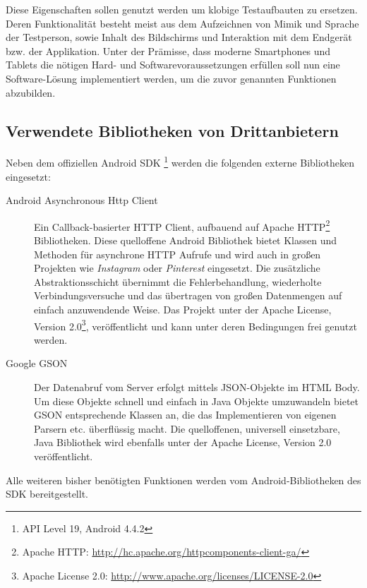 Diese Eigenschaften sollen genutzt werden um klobige Testaufbauten zu ersetzen. 
Deren Funktionalität besteht meist aus dem Aufzeichnen von Mimik und Sprache der Testperson, sowie Inhalt des Bildschirms und Interaktion mit dem Endgerät bzw. der Applikation.
Unter der Prämisse, dass moderne Smartphones und Tablets die nötigen Hard- und Softwarevoraussetzungen erfüllen soll nun eine Software-Lösung implementiert werden, um die zuvor genannten Funktionen abzubilden.

\pagebreak

\subsection{Verwendete Bibliotheken von Drittanbietern}
Neben dem offiziellen Android SDK \footnote{API Level 19, Android 4.4.2} werden die folgenden externe Bibliotheken eingesetzt:
\begin{description}
	\item[Android Asynchronous Http Client\footnotemark]  
	Ein Callback-basierter HTTP Client, aufbauend auf Apache HTTP\footnote{Apache HTTP: \url{http://hc.apache.org/httpcomponents-client-ga/}} Bibliotheken. Diese quelloffene Android Bibliothek bietet Klassen und Methoden für asynchrone HTTP Aufrufe und wird auch in großen Projekten wie \emph{Instagram} oder \emph{Pinterest} eingesetzt. 
	Die zusätzliche Abstraktionsschicht übernimmt die Fehlerbehandlung, wiederholte Verbindungsversuche und das übertragen von großen Datenmengen auf einfach anzuwendende Weise. 
	Das Projekt unter der Apache License, Version 2.0\footnote{Apache License 2.0: \label{ftn:apache_license} \url{http://www.apache.org/licenses/LICENSE-2.0}}, veröffentlicht und kann unter deren Bedingungen frei genutzt werden.
	\item[Google GSON\footnotemark] 
	Der Datenabruf vom Server erfolgt mittels \ac{JSON}-Objekte im HTML Body. Um diese Objekte schnell und einfach in Java Objekte umzuwandeln bietet GSON entsprechende Klassen an, die das Implementieren von eigenen Parsern etc. überflüssig macht.
	Die quelloffenen, universell einsetzbare, Java Bibliothek wird ebenfalls unter der Apache License, Version 2.0 veröffentlicht.
\end{description}
Alle weiteren bisher benötigten Funktionen werden vom Android-Bibliotheken des \ac{SDK} bereitgestellt.

